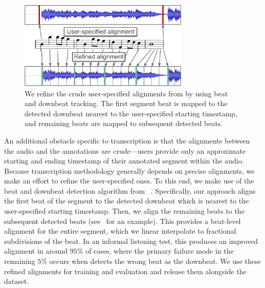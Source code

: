 \begin{figure}
    \centering
    \includegraphics[width=8.1cm]{figs/alignment.pdf}
    \caption{We refine the crude user-specified alignments from \hooktheory{} by using beat and downbeat tracking. The first segment beat is mapped to the detected downbeat nearest to the user-specified starting timestamp, and remaining beats are mapped to subsequent detected beats.}
 \label{fig:alignment}
\end{figure}

An additional obstacle specific to transcription is that the alignments between the audio and the annotations are crude---users provide only an approximate starting and ending timestamp of their annotated segment within the audio. 
Because transcription methodology generally depends on precise alignments, we make an effort to refine the user-specified ones. 
To this end, we make use of the beat and downbeat detection algorithm from \madmom{}~\cite{bock2016joint,bock2016madmom}. 
Specifically, our approach aligns the first beat of the segment to the detected downbeat which is nearest to the user-specified starting timestamp. 
Then, we align the remaining beats to the subsequent detected beats (see~ for an example). 
This provides a beat-level alignment for the entire segment, which we linear interpolate to fractional subdivisions of the beat. 
In an informal listening test, this produces an improved alignment in around $95\%$ of cases, where the primary failure mode in the remaining $5\%$ occurs when \madmom{} detects the wrong beat as the downbeat. 
We use these refined alignments for training and evaluation and release them alongside the dataset.
